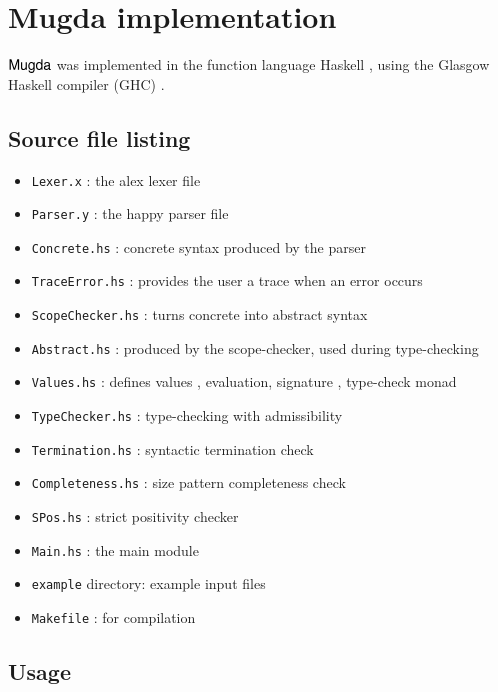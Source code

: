 \appendix
\chapter{Mugda implementation}
$\textsf{Mugda}$ was implemented in the function language Haskell \cite{haskell}, using the Glasgow Haskell compiler (GHC) \cite{jones93glasgow}.

\section{Source file listing}
\begin{itemize}
\item
\texttt{Lexer.x} : the alex lexer file
\item
\texttt{Parser.y} : the happy parser file
\item
\texttt{Concrete.hs} : concrete syntax produced by the parser
\item
\texttt{TraceError.hs} : provides the user a trace when an error occurs
\item
\texttt{ScopeChecker.hs} : turns concrete into abstract syntax
\item
\texttt{Abstract.hs} : produced by the scope-checker, used during type-checking
\item
\texttt{Values.hs} : defines values , evaluation, signature , type-check monad
\item
\texttt{TypeChecker.hs} : type-checking with admissibility
\item
\texttt{Termination.hs} : syntactic termination check
\item
\texttt{Completeness.hs} : size pattern completeness check
\item
\texttt{SPos.hs} : strict positivity checker
\item
\texttt{Main.hs} : the main module
\item
\texttt{example} directory: example input files
\item
\texttt{Makefile} : for compilation
\end{itemize}
\section{Usage}

